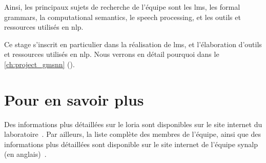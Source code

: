 Ainsi, les principaux sujets de recherche de l'équipe sont les \glspl{lm}, les \gls{formal grammars}, la \gls{computational semantics}, le \gls{speech processing}, et les outils et ressources utilisés en \gls{nlp}.

Ce stage s'inscrit en particulier dans la réalisation de \glspl{lm}, et l'élaboration d'outils et ressources utilisés en \gls{nlp}. Nous verrons en détail pourquoi dans le \autoref{ch:project_gmsnn} ().

\section{Pour en savoir plus}
Des informations plus détaillées sur le \gls{loria} sont disponibles sur {le site internet du laboratoire~\autocite{about_loria}}.
Par ailleurs, la liste complète des membres de l'équipe, ainsi que des informations plus détaillées sont disponible sur {le site internet de l'équipe \gls{synalp} (en anglais)~\autocite{about_synalp}}.
